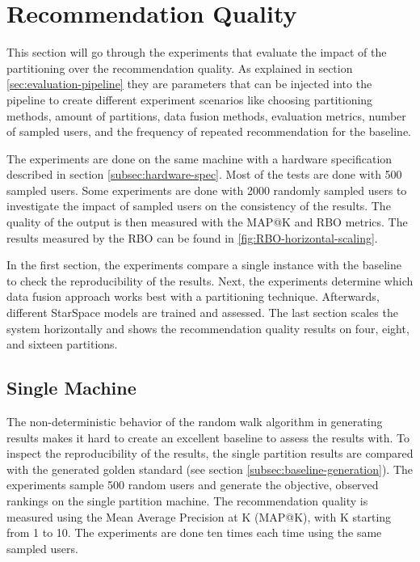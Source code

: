 \section{Recommendation Quality}
\label{sec:recommendation-quality}
This section will go through the experiments that evaluate the impact of the partitioning over the recommendation quality. As explained in section \ref{sec:evaluation-pipeline} they are parameters that can be injected into the pipeline to create different experiment scenarios like choosing partitioning methods, amount of partitions, data fusion methods, evaluation metrics, number of sampled users, and the frequency of repeated recommendation for the baseline.


The experiments are done on the same machine with a hardware specification described in section \ref{subsec:hardware-spec}. Most of the tests are done with 500 sampled users. Some experiments are done with 2000 randomly sampled users to investigate the impact of sampled users on the consistency of the results. The quality of the output is then measured with the MAP@K and RBO metrics. The results measured by the RBO can be found in \ref{fig:RBO-horizontal-scaling}.


In the first section, the experiments compare a single instance with the baseline to check the reproducibility of the results. Next, the experiments determine which data fusion approach works best with a partitioning technique. Afterwards, different StarSpace models are trained and assessed. The last section scales the system horizontally and shows the recommendation quality results on four, eight, and sixteen partitions. 


\subsection{Single Machine}
\label{subsec:eval-single-machine}
The non-deterministic behavior of the random walk algorithm in generating results makes it hard to create an excellent baseline to assess the results with. To inspect the reproducibility of the results, the single partition results are compared with the generated golden standard (see section \ref{subsec:baseline-generation}). The experiments sample 500 random users and generate the objective, observed rankings on the single partition machine. The recommendation quality is measured using the Mean Average Precision at K (MAP@K), with K starting from 1 to 10. The experiments are done ten times each time using the same sampled users. 

